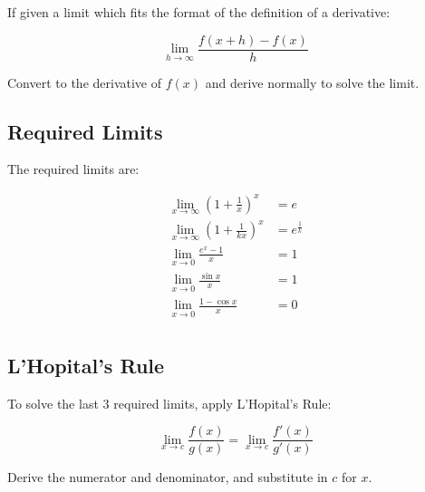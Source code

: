 \documentclass[a4paper,11pt]{article}
\begin{document}
If given a limit which fits the format of the definition of a derivative:

$$
\lim_{h \to \infty} \frac{f(x + h) - f(x)}{h}
$$

Convert to the derivative of $f(x)$ and derive normally to solve the limit.


\subsection{Required Limits}

The required limits are:

$$
\begin{aligned}
\lim_{x \to \infty} (1 + \frac{1}{x})^x & = e \\
\lim_{x \to \infty} (1 + \frac{1}{kx})^x & = e^{\frac{1}{k}} \\
\lim_{x \to 0} \frac{e^x - 1}{x} & = 1 \\
\lim_{x \to 0} \frac{\sin{x}}{x} & = 1 \\
\lim_{x \to 0} \frac{1 - \cos{x}}{x} & = 0 \\
\end{aligned}
$$


\subsection{L'Hopital's Rule}

To solve the last 3 required limits, apply L'Hopital's Rule:

$$
\lim_{x \to c} \frac{f(x)}{g(x)} = \lim_{x \to c} \frac{f'(x)}{g'(x)}
$$

Derive the numerator and denominator, and substitute in $c$ for $x$.
\end{document}
